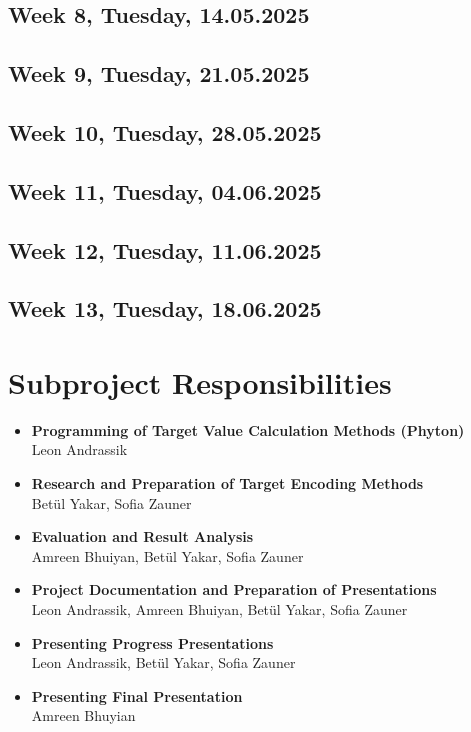 \documentclass[12pt,fleqn,a4paper]{article}
\begin{document}
\subsection{Week 8, Tuesday, 14.05.2025}

\subsection{Week 9, Tuesday, 21.05.2025}

\subsection{Week 10, Tuesday, 28.05.2025}

\subsection{Week 11, Tuesday, 04.06.2025}

\subsection{Week 12, Tuesday, 11.06.2025}

\subsection{Week 13, Tuesday, 18.06.2025}

\newpage

\section{Subproject Responsibilities} %

\begin{itemize}
\item{\textbf{Programming of Target Value Calculation Methods (Phyton)} \\
 Leon Andrassik }
\item{\textbf{Research and Preparation of Target Encoding Methods} \\
\indent Bet\"ul Yakar, Sofia Zauner}
\item{\textbf{Evaluation and Result Analysis} \\
\indent Amreen Bhuiyan, Bet\"ul Yakar, Sofia Zauner}
\item{\textbf{Project Documentation and Preparation of Presentations} \\
\indent Leon Andrassik, Amreen Bhuiyan, Bet\"ul Yakar, Sofia Zauner }
\item{\textbf{Presenting Progress Presentations} \\
\indent Leon Andrassik, Bet\"ul Yakar, Sofia Zauner }
\item{\textbf{Presenting Final Presentation} \\
\indent Amreen Bhuyian }
\end{itemize}
\end{document}
